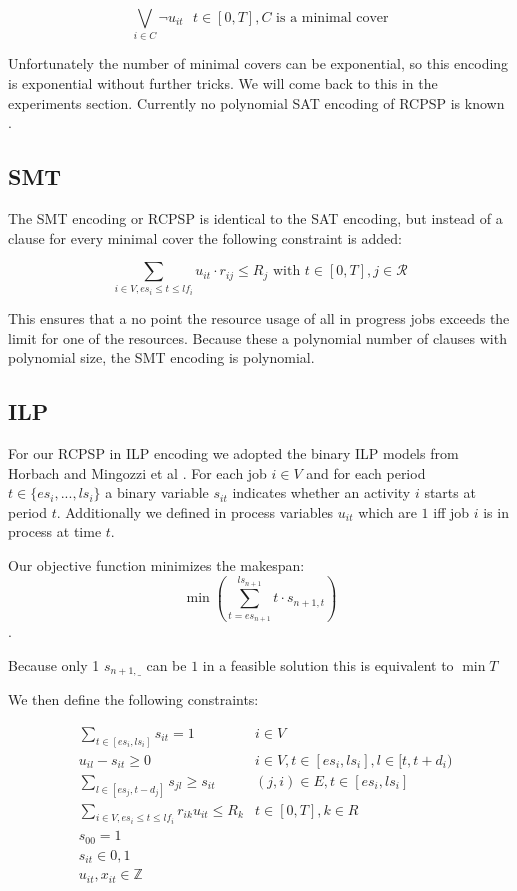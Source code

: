\documentclass{sig-alternate}
\newcommand{\mli}[1]{\mathit{#1}}
\begin{document}
$$\bigvee_{i \in C} \neg u_{it} \text{ } t \in [0,T], C \text{ is a minimal cover}$$

Unfortunately the number of minimal covers can be exponential, so this encoding is exponential without further tricks.
We will come back to this in the experiments section.
Currently no polynomial SAT encoding of RCPSP is known \cite{abdolshah2014review}.

\subsection{SMT}

The SMT encoding or RCPSP is identical to the SAT encoding, but instead of a clause for every minimal cover the following constraint is added:

\[
\sum_{i \in V, {es_i}\leq{t}\leq{lf_i}}{u_{it} \cdot r_{ij} \leq R_j} \text{ with } t \in [0,T], j \in \mathcal{R}
\]

This ensures that a no point the resource usage of all in progress jobs exceeds the limit for one of the resources.
Because these a polynomial number of clauses with polynomial size, the SMT encoding is polynomial.

\subsection{ILP}

For our RCPSP in ILP encoding we adopted the binary ILP models from Horbach \cite{horbach2010boolean} and Mingozzi et al \cite{mingozzi1998exact}.
For each job $i \in V$ and for each period $t \in \{es_i,...,ls_i\}$ a binary variable $s_{it}$ indicates whether an activity $i$ starts at period $t$.
Additionally we defined in process variables $u_{it}$ which are $1$ iff job $i$ is in process at time $t$.

Our objective function minimizes the makespan:
\[\min(\sum\limits_{t=es_{n+1}}^{ls_{n+1}}{t \cdot s_{n+1,t}})\].

Because only 1 $s_{n+1,\_}$ can be $1$ in a feasible solution this is equivalent to $\min{T}$

We then define the following constraints:

\begin{subequations}
\begin{align}
& \sum\limits_{{t}\in{[\mli{es}_i,\mli{ls}_i]}} {s_{it}} = 1 & {i} \in {V} \\
& u_{il} - s_{it} \geq 0 & i \in V, t \in [\mli{es}_i,\mli{ls}_i], l \in [t,t+d_i) \\ 
& \sum\limits_{{l}\in{[\mli{es}_j,t-d_j]}} {s_{jl}} \geq {s_{it}} & {(j,i)} \in {E}, {t} \in {[\mli{es}_i,\mli{ls}_i]} \\
& \sum\limits_{{i}\in{V,}{\mli{es}_i}\leq{t}\leq{lf_i}} {r_{ik}}{u_{it}} \leq {R_k} & {t} \in {[0,{T}]}, {k} \in {R} \\
& {s_{00}} = 1 & \\
& {s_{it}} \in {0, 1} & \\
& {u_{it}}, {x_{it}} \in \mathbb{Z} &
\end{align}
\end{subequations}
\end{document}
